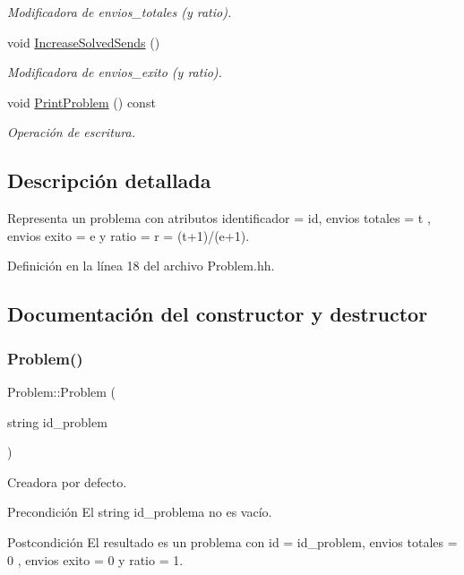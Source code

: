 \begin{DoxyCompactItemize}
\begin{DoxyCompactList}\small\item\em Modificadora de envios\+\_\+totales (y ratio). \end{DoxyCompactList}\item 
void \mbox{\hyperlink{class_problem_ada706600dfd8d1f49096a23f8d22db33}{Increase\+Solved\+Sends}} ()
\begin{DoxyCompactList}\small\item\em Modificadora de envios\+\_\+exito (y ratio). \end{DoxyCompactList}\item 
void \mbox{\hyperlink{class_problem_a17e3ab7cc42f4f8c814fe5e8e08e3e9d}{Print\+Problem}} () const
\begin{DoxyCompactList}\small\item\em Operación de escritura. \end{DoxyCompactList}\end{DoxyCompactItemize}


\subsection{Descripción detallada}
Representa un problema con atributos identificador = id, envios totales = t , envios exito = e y ratio = r = (t+1)/(e+1). 

Definición en la línea 18 del archivo Problem.\+hh.



\subsection{Documentación del constructor y destructor}
\mbox{\label{class_problem_a5f33ca7fa33e9056b5d392daa276809c}} 
\subsubsection{\texorpdfstring{Problem()}{Problem()}}
{\footnotesize\ttfamily Problem\+::\+Problem (\begin{DoxyParamCaption}\item[{string}]{id\+\_\+problem }\end{DoxyParamCaption})}



Creadora por defecto. 

\begin{DoxyPrecond}{Precondición}
El string id\+\_\+problema no es vacío. 
\end{DoxyPrecond}
\begin{DoxyPostcond}{Postcondición}
El resultado es un problema con id = id\+\_\+problem, envios totales = 0 , envios exito = 0 y ratio = 1. 
\end{DoxyPostcond}


